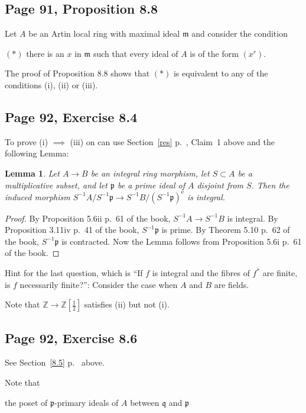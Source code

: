 \documentclass[parskip=half,fontsize=12pt]{scrartcl}%
\newcommand{\oo}{\operatorname}\newcommand{\ooo}{\operatorname*}
\newcommand{\mf}{\mathfrak}
\newcommand{\mmm}{\mf m}
\newcommand{\ppp}{\mf p}
\newcommand{\qqq}{\mf q}
\newtheorem{lem}[thm]{Lemma}
\begin{document}
\subsection{Page 91, Proposition 8.8}\label{88}%

Let $A$ be an Artin local ring with maximal ideal $\mmm$ and consider the condition

$(*)$ there is an $x$ in $\mmm$ such that every ideal of $A$ is of the form $(x^r)$. 

The proof of Proposition 8.8 shows that $(*)$ is equivalent to any of the conditions (i), (ii) or (iii). 

\subsection{Page 92, Exercise 8.4}%

To prove (i) $\implies$ (iii) on can use Section~\ref{res} p.~\pageref{res}, Claim~1 above and the following Lemma:

\begin{lem}
Let $A\to B$ be an integral ring morphism, let $S\subset A$ be a multiplicative subset, and let $\ppp$ be a prime ideal of $A$ disjoint from $S$. Then the induced morphism $S^{-1}A/S^{-1}\ppp\to S^{-1}B/(S^{-1}\ppp)^{\oo e}$ is integral.
\end{lem} 
 
\begin{proof}
By Proposition 5.6ii p.~61 of the book, $S^{-1}A\to S^{-1}B$ is integral. By Proposition 3.11iv p.~41 of the book, $S^{-1}\ppp$ is prime. By Theorem 5.10 p.~62 of the book, $S^{-1}\ppp$ is contracted. Now the Lemma follows from Proposition 5.6i p.~61 of the book.
\end{proof}

Hint for the last question, which is ``If $f$ is integral and the fibres of $f^*$ are finite, is $f$ necessarily finite?'': Consider the case when $A$ and $B$ are fields. 

Note that $\mathbb Z\to\mathbb Z[\frac12]$ satisfies (ii) but not (i).

\subsection{Page 92, Exercise 8.6}%

See Section~\ref{8.5} p.~\pageref{8.5} above. 

Note that 

\qquad the poset of $\ppp$-primary ideals of $A$ between $\qqq$ and $\ppp$ 
\end{document}
